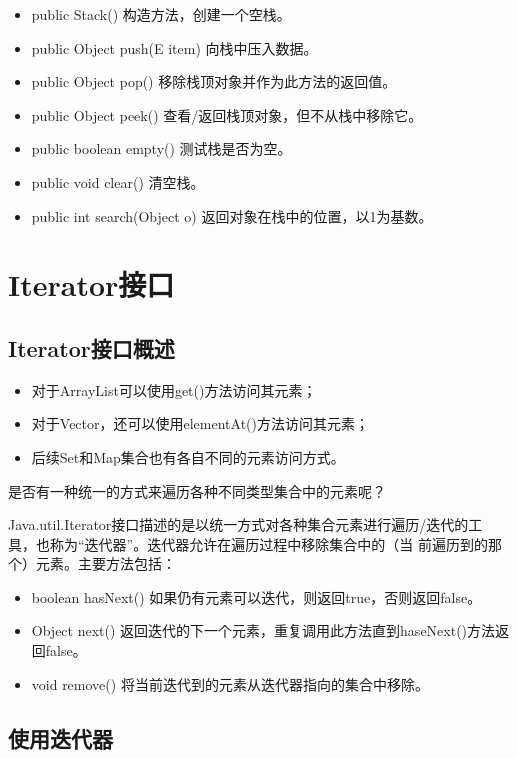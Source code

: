 \begin{itemize}
\item public Stack() 构造方法，创建一个空栈。
\item public Object push(E item) 向栈中压入数据。
\item public Object pop() 移除栈顶对象并作为此方法的返回值。
\item public Object peek() 查看/返回栈顶对象，但不从栈中移除它。
\item public boolean empty() 测试栈是否为空。
\item public void clear() 清空栈。
\item public int search(Object o) 返回对象在栈中的位置，以1为基数。
\end{itemize}

\section{Iterator接口}

\subsection{Iterator接口概述}

\begin{itemize}
\item 对于ArrayList可以使用get()方法访问其元素；
\item 对于Vector，还可以使用elementAt()方法访问其元素；
\item 后续Set和Map集合也有各自不同的元素访问方式。
\end{itemize}

{\Blue\hei 是否有一种统一的方式来遍历各种不同类型集合中的元素呢？}

Java.util.Iterator接口描述的是以统一方式对各种集合元素进行遍历/迭代的工
具，也称为“{\Blue\hei 迭代器}”。迭代器允许在遍历过程中移除集合中的（当
前遍历到的那个）元素。主要方法包括：

\begin{itemize}
\item boolean hasNext() 如果仍有元素可以迭代，则返回true，否则返回false。
\item Object next() 返回迭代的下一个元素，重复调用此方法直到haseNext()方法返回false。
\item void remove() 将当前迭代到的元素从迭代器指向的集合中移除。
\end{itemize}

\subsection{使用迭代器}

